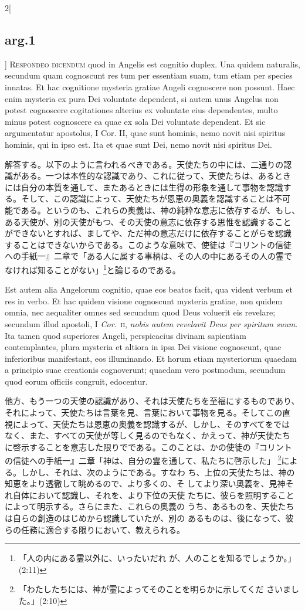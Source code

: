 \documentclass[paper=a4paper,fontsize=10pt,jafontsize=9pt,titlepage]{jlreq}
\begin{document}
\begin{paracol}{2}[\subsection{arg.1}]
{\scshape Respondeo dicendum} quod in Angelis est cognitio duplex. Una
quidem naturalis, secundum quam cognoscunt res tum per essentiam suam,
tum etiam per species innatas. Et hac cognitione mysteria gratiae
Angeli cognoscere non possunt. Haec enim mysteria ex pura Dei
voluntate dependent, si autem unus Angelus non potest cognoscere
cogitationes alterius ex voluntate eius dependentes, multo minus
potest cognoscere ea quae ex sola Dei voluntate dependent. Et sic
argumentatur apostolus, I Cor. II, quae sunt hominis, nemo novit nisi
spiritus hominis, qui in ipso est. Ita et quae sunt Dei, nemo novit
nisi spiritus Dei.

\switchcolumn

解答する。以下のように言われるべきである。天使たちの中には、二通りの認
識がある。一つは本性的な認識であり、これに従って、天使たちは、あるとき
には自分の本質を通して、またあるときには生得の形象を通して事物を認識す
る。そして、この認識によって、天使たちが恩恵の奥義を認識することは不可
能である。というのも、これらの奥義は、神の純粋な意志に依存するが、もし、
ある天使が、別の天使がもつ、その天使の意志に依存する思惟を認識すること
ができないとすれば、ましてや、ただ神の意志だけに依存することがらを認識
することはできないからである。このような意味で、使徒は『コリントの信徒
への手紙一』二章で「ある人に属する事柄は、その人の中にあるその人の霊で
なければ知ることがない」\footnote{「人の内にある霊以外に、いったいだれ
が、人のことを知るでしょうか。」(2:11)}と論じるのである。

\switchcolumn*

Est autem alia Angelorum cognitio, quae eos beatos facit, qua vident
verbum et res in verbo. Et hac quidem visione cognoscunt mysteria
gratiae, non quidem omnia, nec aequaliter omnes sed secundum quod Deus
voluerit eis revelare; secundum illud apostoli, I {\itshape
Cor}.~{\scshape ii}, {\itshape nobis autem revelavit Deus per spiritum
suum}. Ita tamen quod superiores Angeli, perspicacius divinam
sapientiam contemplantes, plura mysteria et altiora in ipsa Dei
visione cognoscunt, quae inferioribus manifestant, eos illuminando. Et
horum etiam mysteriorum quaedam a principio suae creationis
cognoverunt; quaedam vero postmodum, secundum quod eorum officiis
congruit, edocentur.

\switchcolumn

他方、もう一つの天使の認識があり、それは天使たちを至福にするものであり、
それによって、天使たちは言葉を見、言葉において事物を見る。そしてこの直
視によって、天使たちは恩恵の奥義を認識するが、しかし、そのすべてをでは
なく、また、すべての天使が等しく見るのでもなく、かえって、神が天使たち
に啓示することを意志した限りでである。このことは、かの使徒の『コリント
の信徒への手紙一』二章「神は、自分の霊を通して、私たちに啓示した」
\footnote{「わたしたちには、神が霊によってそのことを明らかに示してくだ
さいました。」(2:10)}による。しかし、それは、次のようにである。すなわ
ち、上位の天使たちは、神の知恵をより透徹して眺めるので、より多くの、そ
してより深い奥義を、見神それ自体において認識し、それを、より下位の天使
たちに、彼らを照明することによって明示する。さらにまた、これらの奥義の
うち、あるものを、天使たちは自らの創造のはじめから認識していたが、別の
あるものは、後になって、彼らの任務に適合する限りにおいて、教えられる。


\end{paracol}
\end{document}
